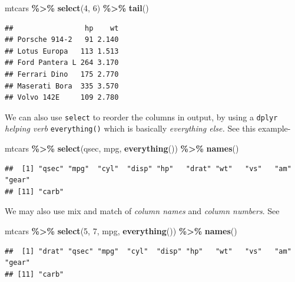 \documentclass[
]{book}
\newenvironment{Shaded}{\begin{snugshade}}{\end{snugshade}}
\newcommand{\DecValTok}[1]{\textcolor[rgb]{0.00,0.00,0.81}{#1}}
\newcommand{\FunctionTok}[1]{\textcolor[rgb]{0.13,0.29,0.53}{\textbf{#1}}}
\newcommand{\NormalTok}[1]{#1}
\newcommand{\SpecialCharTok}[1]{\textcolor[rgb]{0.81,0.36,0.00}{\textbf{#1}}}
\begin{document}
\begin{Shaded}
\begin{Highlighting}[]
\NormalTok{mtcars }\SpecialCharTok{\%\textgreater{}\%} 
  \FunctionTok{select}\NormalTok{(}\DecValTok{4}\NormalTok{, }\DecValTok{6}\NormalTok{) }\SpecialCharTok{\%\textgreater{}\%} 
  \FunctionTok{tail}\NormalTok{()}
\end{Highlighting}
\end{Shaded}

\begin{verbatim}
##                 hp    wt
## Porsche 914-2   91 2.140
## Lotus Europa   113 1.513
## Ford Pantera L 264 3.170
## Ferrari Dino   175 2.770
## Maserati Bora  335 3.570
## Volvo 142E     109 2.780
\end{verbatim}

We can also use \texttt{select} to reorder the columns in output, by using a \texttt{dplyr} \emph{helping verb} \texttt{everything()} which is basically \emph{everything else.} See this example-

\begin{Shaded}
\begin{Highlighting}[]
\NormalTok{mtcars }\SpecialCharTok{\%\textgreater{}\%} 
  \FunctionTok{select}\NormalTok{(qsec, mpg, }\FunctionTok{everything}\NormalTok{()) }\SpecialCharTok{\%\textgreater{}\%} 
  \FunctionTok{names}\NormalTok{()}
\end{Highlighting}
\end{Shaded}

\begin{verbatim}
##  [1] "qsec" "mpg"  "cyl"  "disp" "hp"   "drat" "wt"   "vs"   "am"   "gear"
## [11] "carb"
\end{verbatim}

We may also use mix and match of \emph{column names} and \emph{column numbers}. See

\begin{Shaded}
\begin{Highlighting}[]
\NormalTok{mtcars }\SpecialCharTok{\%\textgreater{}\%} 
  \FunctionTok{select}\NormalTok{(}\DecValTok{5}\NormalTok{, }\DecValTok{7}\NormalTok{, mpg, }\FunctionTok{everything}\NormalTok{()) }\SpecialCharTok{\%\textgreater{}\%} 
  \FunctionTok{names}\NormalTok{()}
\end{Highlighting}
\end{Shaded}

\begin{verbatim}
##  [1] "drat" "qsec" "mpg"  "cyl"  "disp" "hp"   "wt"   "vs"   "am"   "gear"
## [11] "carb"
\end{verbatim}
\end{document}

